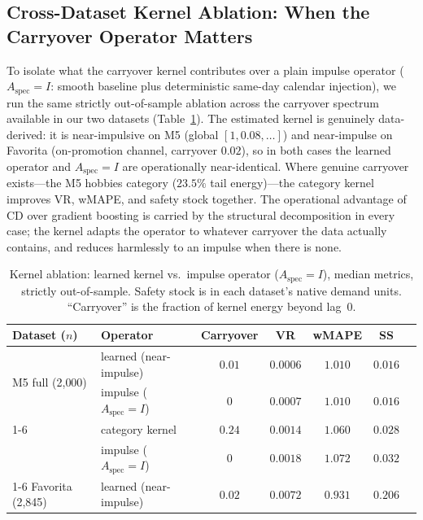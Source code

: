 \documentclass[10pt]{article} %
\theoremstyle{plain}
\theoremstyle{definition}
\newcommand{\Aspec}{A_{\text{spec}}}
\begin{document}
\subsection{Cross-Dataset Kernel Ablation: When the Carryover Operator Matters}
\label{app:kernel_ablation}

To isolate what the carryover kernel contributes over a plain impulse operator ($\Aspec=I$: smooth baseline plus deterministic same-day calendar injection), we run the same strictly out-of-sample ablation across the carryover spectrum available in our two datasets (Table~\ref{tab:kernel_ablation}). The estimated kernel is genuinely data-derived: it is near-impulsive on M5 (global $[1,0.08,\dots]$) and near-impulse on Favorita (on-promotion channel, carryover $0.02$), so in both cases the learned operator and $\Aspec=I$ are operationally near-identical. Where genuine carryover exists---the M5 hobbies category ($23.5\%$ tail energy)---the category kernel improves VR, wMAPE, and safety stock together. The operational advantage of CD over gradient boosting is carried by the structural decomposition in every case; the kernel adapts the operator to whatever carryover the data actually contains, and reduces harmlessly to an impulse when there is none.

\begin{table}[ht]
\centering
\footnotesize
\setlength{\tabcolsep}{4pt}
\caption{Kernel ablation: learned kernel vs.\ impulse operator ($\Aspec=I$), median metrics, strictly out-of-sample. Safety stock is in each dataset's native demand units. ``Carryover'' is the fraction of kernel energy beyond lag~0.}
\label{tab:kernel_ablation}
\begin{tabular}{@{}llccccc@{}}
\toprule
Dataset ($n$) & Operator & Carryover & VR & wMAPE & SS \\
\midrule
\multirow{2}{*}{M5 full (2{,}000)} & learned (near-impulse) & $0.01$ & $0.0006$ & $1.010$ & $0.016$ \\
 & impulse ($\Aspec=I$) & $0$ & $0.0007$ & $1.010$ & $0.016$ \\
\cmidrule(lr){1-6}
\multirow{2}{*}{M5 hobbies (748)} & category kernel & $0.24$ & $\mathbf{0.0014}$ & $\mathbf{1.060}$ & $\mathbf{0.028}$ \\
 & impulse ($\Aspec=I$) & $0$ & $0.0018$ & $1.072$ & $0.032$ \\
\cmidrule(lr){1-6}
Favorita (2{,}845) & learned (near-impulse) & $0.02$ & $0.0072$ & $0.931$ & $0.206$ \\
\bottomrule
\end{tabular}
\end{table}
\end{document}
